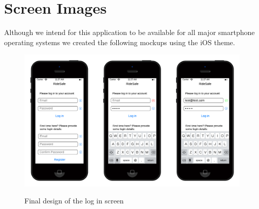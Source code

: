 \documentclass[a4paper]{report}
\begin{document}
{\section{Screen Images}
Although we intend for this application to be available for all major smartphone operating systems we created the following mockups using the iOS theme.
\begin{figure}[h]
\centering
\includegraphics[scale=0.6]{figures/final_design/log_in}
\label{fig:login}
\caption{Final design of the log in screen}
\end{figure}
\begin{figure}[H]
\centering

\end{figure}}
\end{document}
